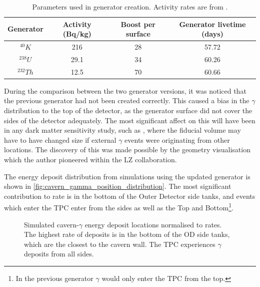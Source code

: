 \begin{table}
    \centering
    \begin{tabular}{c|c|c|c}
        Generator    & Activity (Bq/kg) & Boost per surface & Generator livetime (days)  \\ \hline
        ${}^{40}K$   & 216              & 28                & 57.72                      \\
        ${}^{238}U$  & 29.1             & 34                & 60.26                      \\
        ${}^{232}Th$ & 12.5             & 70                & 60.66
    \end{tabular}
    \caption{Parameters used in generator creation. Activity rates are from \cite{LZ_Gamma_Ray_Background_ref}.}
    \label{tab:cavern_gamma_generator_parameters}
\end{table}





\par
During the comparison between the two generator versions, it was noticed that the previous generator had not been created correctly.
This caused a bias in the $\gamma$ distribution to the top of the detector, as the generator surface did not cover the sides of the detector adequately.
The most significant affect on this will have been in any dark matter sensitivity study, such as \cite{lz_simulations_ref}, where the fiducial volume may have to have changed size if external $\gamma$ events were originating from other locations.
The discovery of this was made possible by the geometry visualisation which the author pioneered within the LZ collaboration.

\par
The energy deposit distribution from simulations using the updated generator is shown in \autoref{fig:cavern_gamma_position_distribution}.
The most significant contribution to rate is in the bottom of the Outer Detector side tanks, and events which enter the TPC enter from the sides as well as the Top and Bottom\footnote{In the previous generator $\gamma$ would only enter the TPC from the top.}.

\begin{figure}
    \centering
    \resizebox{\textwidth}{!}{

}
    \caption[Simulated cavern-$\gamma$ energy deposit locations normalised to rates.]{Simulated cavern-$\gamma$ energy deposit locations normalised to rates.
             The highest rate of deposits is in the bottom of the OD side tanks, which are the closest to the cavern wall.
             The TPC experiences $\gamma$ deposits from all sides.}
    \label{fig:cavern_gamma_position_distribution}
\end{figure}